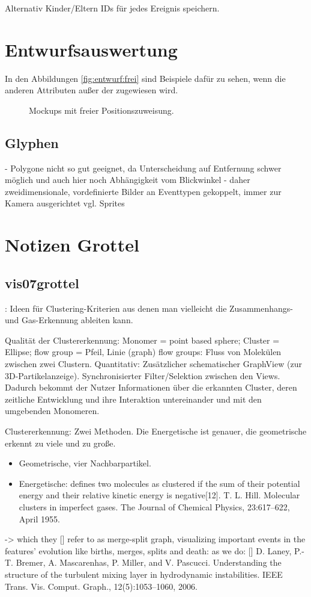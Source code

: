 Alternativ Kinder/Eltern IDs für jedes Ereignis speichern.


\chapter{Entwurfsauswertung}

In den Abbildungen \autoref{fig:entwurf:frei} sind Beispiele dafür zu sehen, wenn die  anderen Attributen außer der  zugewiesen wird.

\begin{figure}
	\caption{Mockups mit freier Positionszuweisung.}\label{fig:entwurf:frei}
\end{figure}

\section{Glyphen}
- Polygone nicht so gut geeignet, da Unterscheidung auf Entfernung schwer möglich und auch hier noch Abhängigkeit vom Blickwinkel
- daher zweidimensionale, vordefinierte Bilder an Eventtypen gekoppelt, immer zur Kamera ausgerichtet vgl. Sprites

\chapter{Notizen Grottel}

\section{vis07grottel}
\cite{vis07grottel}:  Ideen für Clustering-Kriterien aus denen man vielleicht die Zusammenhangs- und Gas-Erkennung ableiten kann.

Qualität der Clustererkennung: Monomer = point based sphere; Cluster = Ellipse; flow group = Pfeil, Linie (graph)
flow groups: Fluss von Molekülen zwischen zwei Clustern.
Quantitativ: Zusätzlicher schematischer GraphView (zur 3D-Partikelanzeige). Synchronisierter Filter/Selektion zwischen den Views. Dadurch bekommt der Nutzer Informationen über die erkannten Cluster, deren zeitliche Entwicklung und ihre Interaktion untereinander und mit den umgebenden Monomeren.

Clustererkennung: Zwei Methoden.\cite[S.~6]{vis07grottel} Die Energetische ist genauer, die geometrische erkennt zu viele und zu große.
\begin{itemize}
	\item Geometrische, vier Nachbarpartikel.
	\item Energetische: defines two	molecules as clustered if the sum of their potential energy and their relative kinetic energy is negative[12].  T. L. Hill. Molecular clusters in imperfect gases. The Journal of Chemical
	Physics, 23:617–622, April 1955.
\end{itemize}
-> which they [] refer to as merge-split graph, visualizing important events in the features’ evolution like births, merges, splits and death: as we do:
[] D. Laney, P.-T. Bremer, A. Mascarenhas, P. Miller, and V. Pascucci. Understanding the structure of the turbulent mixing layer in hydrodynamic instabilities. IEEE Trans. Vis. Comput. Graph., 12(5):1053–1060, 2006.


